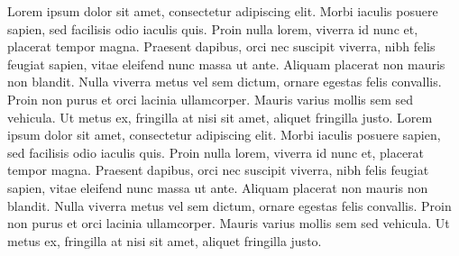 Lorem ipsum dolor sit amet, consectetur adipiscing elit. Morbi iaculis posuere sapien, sed facilisis odio iaculis quis. 
Proin nulla lorem, viverra id nunc et, placerat tempor magna. Praesent dapibus, orci nec suscipit viverra, nibh felis feugiat sapien, 
vitae eleifend nunc massa ut ante. Aliquam placerat non mauris non blandit. Nulla viverra metus vel sem dictum, ornare egestas felis convallis. 
Proin non purus et orci lacinia ullamcorper. Mauris varius mollis sem sed vehicula. Ut metus ex, fringilla at nisi sit amet, aliquet fringilla justo.
Lorem ipsum dolor sit amet, consectetur adipiscing elit. Morbi iaculis posuere sapien, sed facilisis odio iaculis quis. 
Proin nulla lorem, viverra id nunc et, placerat tempor magna. Praesent dapibus, orci nec suscipit viverra, nibh felis feugiat sapien, 
vitae eleifend nunc massa ut ante. Aliquam placerat non mauris non blandit. Nulla viverra metus vel sem dictum, ornare egestas felis convallis. 
Proin non purus et orci lacinia ullamcorper. Mauris varius mollis sem sed vehicula. Ut metus ex, fringilla at nisi sit amet, aliquet fringilla justo.

